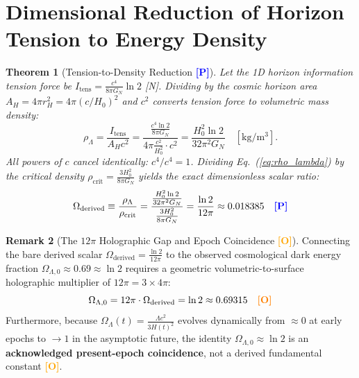 \documentclass[aps,prd,twocolumn,superscriptaddress,nofootinbib,floatfix]{revtex4-2}
\newcommand{\tagP}{\textcolor{blue}{\textbf{[P]}}}
\newcommand{\tagO}{\textcolor{orange}{\textbf{[O]}}}
\theoremstyle{plain}
\newtheorem{theorem}{Theorem}[section]
\theoremstyle{definition}
\newtheorem{remark}[theorem]{Remark}
\begin{document}
\section{Dimensional Reduction of Horizon Tension to Energy Density}
\label{sec:dark_energy}

\begin{theorem}[Tension-to-Density Reduction \tagP]
\label{thm:density_reduction}
Let the 1D horizon information tension force be $I_{\mathrm{tens}} = \frac{c^4}{8\pi G_N} \ln 2$ [N]. Dividing by the cosmic horizon area $A_H = 4\pi r_H^2 = 4\pi (c/H_0)^2$ and $c^2$ converts tension force to volumetric mass density:
\begin{equation}
\rho_\Lambda = \frac{I_{\mathrm{tens}}}{A_H c^2} = \frac{\frac{c^4 \ln 2}{8\pi G_N}}{4\pi \frac{c^2}{H_0^2} \cdot c^2} = \frac{H_0^2 \ln 2}{32 \pi^2 G_N} \quad [\mathrm{kg/m^3}].
\label{eq:rho_lambda}
\end{equation}
All powers of $c$ cancel identically: $c^4 / c^4 = 1$. Dividing Eq.~(\ref{eq:rho_lambda}) by the critical density $\rho_{\mathrm{crit}} = \frac{3 H_0^2}{8\pi G_N}$ yields the exact dimensionless scalar ratio:
\begin{equation}
\Omega_{\mathrm{derived}} \equiv \frac{\rho_\Lambda}{\rho_{\mathrm{crit}}} = \frac{\frac{H_0^2 \ln 2}{32 \pi^2 G_N}}{\frac{3 H_0^2}{8\pi G_N}} = \frac{\ln 2}{12\pi} \approx 0.018385 \quad \tagP
\label{eq:omega_derived}
\end{equation}
\end{theorem}

\begin{remark}[The $12\pi$ Holographic Gap and Epoch Coincidence \tagO]
\label{rem:omega_gap}
Connecting the bare derived scalar $\Omega_{\mathrm{derived}} = \frac{\ln 2}{12\pi}$ to the observed cosmological dark energy fraction $\Omega_{\Lambda,0} \approx 0.69 \approx \ln 2$ requires a geometric volumetric-to-surface holographic multiplier of $12\pi = 3 \times 4\pi$:
\begin{equation}
\Omega_{\Lambda,0} = 12\pi \cdot \Omega_{\mathrm{derived}} = \ln 2 \approx 0.69315 \quad \tagO
\end{equation}
Furthermore, because $\Omega_\Lambda(t) = \frac{\Lambda c^2}{3 H(t)^2}$ evolves dynamically from $\approx 0$ at early epochs to $\to 1$ in the asymptotic future, the identity $\Omega_{\Lambda,0} \approx \ln 2$ is an \textbf{acknowledged present-epoch coincidence}, not a derived fundamental constant \tagO.
\end{remark}
\end{document}
